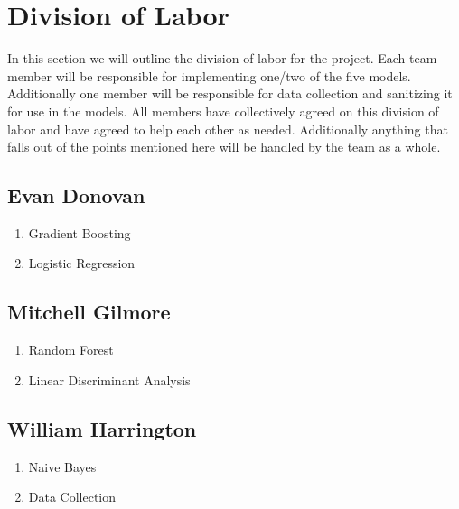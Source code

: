 \documentclass[10pt,twocolumn,letterpaper]{article}
\begin{document}
\section{Division of Labor}

In this section we will outline the division of labor for the project.
Each team member will be responsible for implementing one/two of the five models.
Additionally one member will be responsible for data collection and sanitizing it for use in the models.
All members have collectively agreed on this division of labor and have agreed to help each other as needed.
Additionally anything that falls out of the points mentioned here will be handled by the team as a whole.

\subsection{Evan Donovan}
\begin{enumerate}
  \item Gradient Boosting
  \item Logistic Regression
\end{enumerate}

\subsection{Mitchell Gilmore}
\begin{enumerate}
  \item Random Forest
  \item Linear Discriminant Analysis
\end{enumerate}

\subsection{William Harrington}
\begin{enumerate}
  \item Naive Bayes
  \item Data Collection
\end{enumerate}

{
  \small
  
  
}
\end{document}
